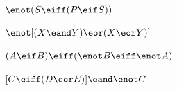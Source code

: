 \begin{compactlist}

\item $\enot (S \eiff (P \eif S))$



 \item $\enot [(X \eand Y) \eor (X \eor Y)]$



\item $(A \eif B) \eiff (\enot B\eiff \enot A)$

\item $[C \eiff (D \eor E)] \eand \enot C$



\end{compactlist}
